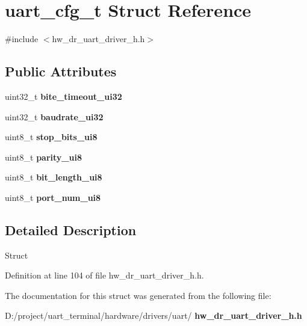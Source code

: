 \section{uart\+\_\+cfg\+\_\+t Struct Reference}
\label{structuart__cfg__t}


{\ttfamily \#include $<$hw\+\_\+dr\+\_\+uart\+\_\+driver\+\_\+h.\+h$>$}

\subsection*{Public Attributes}
\begin{DoxyCompactItemize}
\item 
\mbox{\label{structuart__cfg__t_adcd96cf8a269cc0c9a62d929b142eb40}} 
uint32\+\_\+t {\bfseries bite\+\_\+timeout\+\_\+ui32}
\item 
\mbox{\label{structuart__cfg__t_aad4209ebb7eb6cd75275b1388e59db8f}} 
uint32\+\_\+t {\bfseries baudrate\+\_\+ui32}
\item 
\mbox{\label{structuart__cfg__t_a9de038d30b92ae689115827e9a9cf822}} 
uint8\+\_\+t {\bfseries stop\+\_\+bits\+\_\+ui8}
\item 
\mbox{\label{structuart__cfg__t_ac375443ded6d7469535b8b7ef1efb8f0}} 
uint8\+\_\+t {\bfseries parity\+\_\+ui8}
\item 
\mbox{\label{structuart__cfg__t_a535acebd40a3e2a1bc97d6500c54ea70}} 
uint8\+\_\+t {\bfseries bit\+\_\+length\+\_\+ui8}
\item 
\mbox{\label{structuart__cfg__t_a8c8062a11474fb19e8a5f3da6fe852c4}} 
uint8\+\_\+t {\bfseries port\+\_\+num\+\_\+ui8}
\end{DoxyCompactItemize}


\subsection{Detailed Description}
Struct 

Definition at line 104 of file hw\+\_\+dr\+\_\+uart\+\_\+driver\+\_\+h.\+h.



The documentation for this struct was generated from the following file\+:\begin{DoxyCompactItemize}
\item 
D\+:/project/uart\+\_\+terminal/hardware/drivers/uart/\textbf{ hw\+\_\+dr\+\_\+uart\+\_\+driver\+\_\+h.\+h}\end{DoxyCompactItemize}
